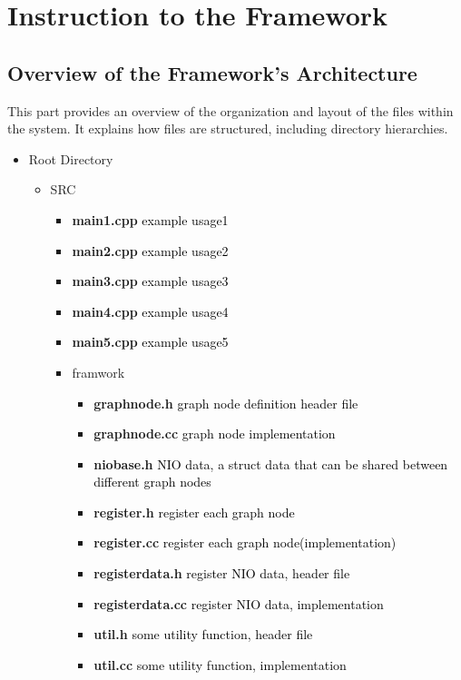 \documentclass{article}
\begin{document}
\section{Instruction to the Framework}

\subsection{Overview of the Framework's Architecture}


This part provides an overview of the organization and layout of the files within the system. It explains how files are structured, including directory hierarchies.

\begin{itemize}
  \item Root Directory
    \begin{itemize}
      \item  SRC
        \begin{itemize}
          \item  \textbf{main1.cpp} \quad \textcolor{black}{\small example usage1}
          \item  \textbf{main2.cpp} \quad \textcolor{black}{\small example usage2}
          \item  \textbf{main3.cpp} \quad \textcolor{black}{\small example usage3}
          \item  \textbf{main4.cpp} \quad \textcolor{black}{\small example usage4}
          \item  \textbf{main5.cpp} \quad \textcolor{black}{\small example usage5}
          \item  framwork
            \begin{itemize}
              \item  \textbf{graphnode.h} \quad \textcolor{black}{\small graph node definition header file}
              \item  \textbf{graphnode.cc} \quad \textcolor{black}{\small graph node implementation}
              \item  \textbf{niobase.h} \quad \textcolor{black}{\small NIO data, a struct data that can be shared between different graph nodes}
              \item  \textbf{register.h} \quad \textcolor{black}{\small register each graph node}
              \item  \textbf{register.cc} \quad \textcolor{black}{\small register each graph node(implementation)}
              \item  \textbf{registerdata.h} \quad \textcolor{black}{\small register NIO data, header file}
              \item  \textbf{registerdata.cc} \quad \textcolor{black}{\small register NIO data, implementation}
              \item  \textbf{util.h} \quad \textcolor{black}{\small some utility function, header file}
              \item  \textbf{util.cc} \quad \textcolor{black}{\small some utility function, implementation}
            \end{itemize}
        \end{itemize}


\end{itemize}
\end{itemize}
\end{document}
